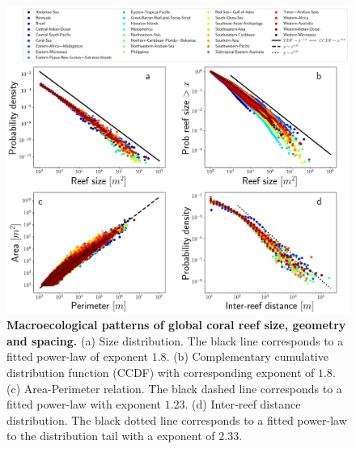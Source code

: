 \begin{figure}[H]
    \centering
    \includegraphics[width=\textwidth]{Figures/general_analysis.png}
    \caption{\textbf{Macroecological patterns of global coral reef size,
            geometry and spacing.} (a) Size distribution. The black line
        corresponds to a
        fitted power-law of exponent $1.8$. (b) Complementary cumulative
        distribution
        function (CCDF) with corresponding exponent of $1.8$. (c)
        Area-Perimeter
        relation. The black dashed line corresponds to a fitted power-law with
        exponent
        $1.23$. (d) Inter-reef distance distribution. The black dotted line
        corresponds
        to a fitted power-law to the distribution tail with a exponent of
        $2.33$.}
    \label{fig:general_analysis}
\end{figure}

